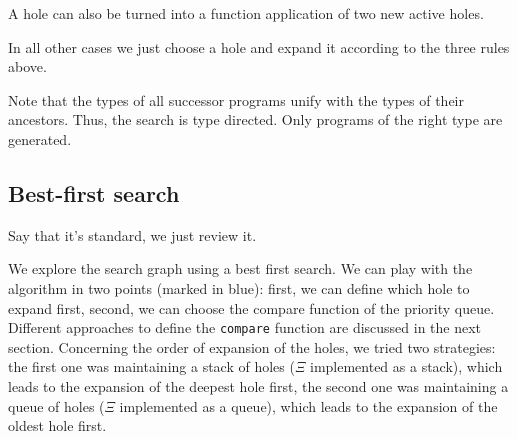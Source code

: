 \begin{prooftree}
\end{prooftree}

A hole can also be turned into a function application of two new active holes.
\begin{prooftree}
\end{prooftree}

In all other cases we just choose a hole and expand it according to the three rules above.
\begin{prooftree}
\end{prooftree}

Note that the types of all successor programs unify with the types of their ancestors. Thus, the search is type directed. Only programs of the right type are generated.


\subsection{Best-first search}\label{Exploration}
Say that it's standard, we just review it.


We explore the search graph using a best first search.
We can play with the algorithm in two points (marked in blue): first, we can define which hole to expand first, second, we can choose the compare function of the priority queue.
Different approaches to define the \lstinline?compare? function are discussed in the next section.
Concerning the order of expansion of the holes, we tried two strategies: the first one was maintaining a stack of holes ($\Xi$ implemented as a stack), which leads to the expansion of the deepest hole first, the second one was maintaining a queue of holes ($\Xi$ implemented as a queue), which leads to the expansion of the oldest hole first.

